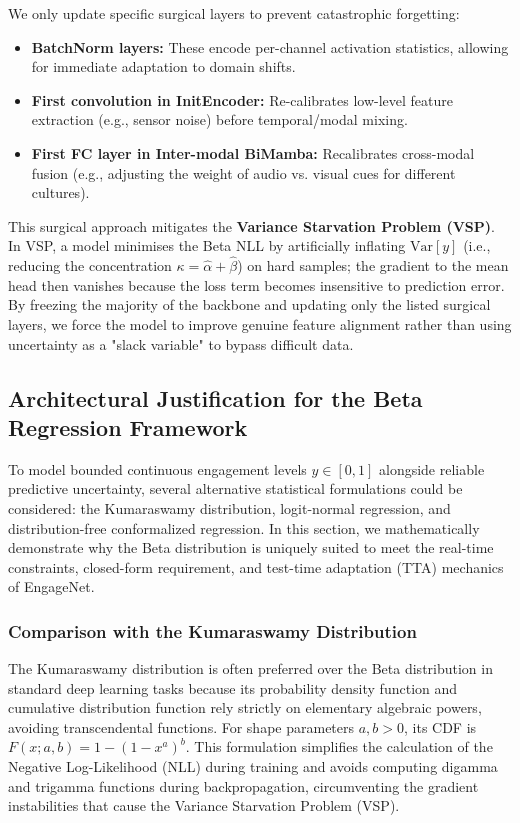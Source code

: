 \documentclass[11pt,a4paper]{article}
\begin{document}
	We only update specific surgical layers to prevent catastrophic forgetting:
	\begin{itemize}
		\item \textbf{BatchNorm layers:} These encode per-channel activation statistics, allowing for immediate adaptation to domain shifts.
		\item \textbf{First convolution in InitEncoder:} Re-calibrates low-level feature extraction (e.g., sensor noise) before temporal/modal mixing.
		\item \textbf{First FC layer in Inter-modal BiMamba:} Recalibrates cross-modal fusion (e.g., adjusting the weight of audio vs. visual cues for different cultures).
	\end{itemize}
	
	This surgical approach mitigates the \textbf{Variance Starvation Problem (VSP)}. In VSP, a model minimises the Beta NLL by artificially inflating $\mathrm{Var}[y]$ (i.e., reducing the concentration $\kappa = \hat{\alpha}+\hat{\beta}$) on hard samples; the gradient to the mean head then vanishes because the loss term becomes insensitive to prediction error. By freezing the majority of the backbone and updating only the listed surgical layers, we force the model to improve genuine feature alignment rather than using uncertainty as a "slack variable" to bypass difficult data.
	
	\subsection{Architectural Justification for the Beta Regression Framework}
	To model bounded continuous engagement levels $y \in [0,1]$ alongside reliable predictive uncertainty, several alternative statistical formulations could be considered: the Kumaraswamy distribution, logit-normal regression, and distribution-free conformalized regression. In this section, we mathematically demonstrate why the Beta distribution is uniquely suited to meet the real-time constraints, closed-form requirement, and test-time adaptation (TTA) mechanics of EngageNet.
	
	\subsubsection*{Comparison with the Kumaraswamy Distribution}
	The Kumaraswamy distribution \cite{kumaraswamy1980} is often preferred over the Beta distribution in standard deep learning tasks \cite{pumi2020} because its probability density function and cumulative distribution function rely strictly on elementary algebraic powers, avoiding transcendental functions. For shape parameters $a, b > 0$, its CDF is $F(x; a, b) = 1 - (1-x^a)^b$. This formulation simplifies the calculation of the Negative Log-Likelihood (NLL) during training and avoids computing digamma and trigamma functions during backpropagation, circumventing the gradient instabilities that cause the Variance Starvation Problem (VSP).
	
\end{document}
